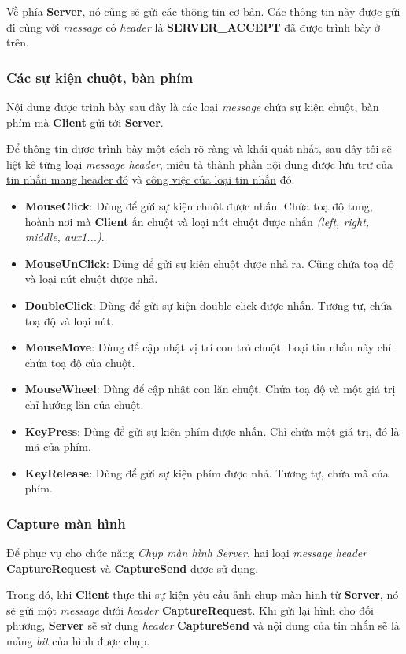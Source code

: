 Về phía \textbf{Server}, nó cũng sẽ gửi các thông tin cơ bản. Các thông tin này được gửi đi cùng với \textit{message} có  \textit{header} là \textbf{SERVER\_ACCEPT} đã được trình bày ở trên.

\subsubsection {Các sự kiện chuột, bàn phím}

Nội dung được trình bày sau đây là các loại \textit{message} chứa sự kiện chuột, bàn phím mà \textbf{Client} gửi tới \textbf{Server}.

Để thông tin được trình bày một cách rõ ràng và khái quát nhất, sau đây tôi sẽ liệt kê từng loại \textit{message header}, miêu tả thành phần nội dung được lưu trữ của \underline{tin nhắn mang header đó} và \underline{công việc của loại tin nhắn} đó.

\begin{itemize}
	\item \textbf{MouseClick}:  Dùng để gửi sự kiện chuột được nhấn. Chứa toạ độ tung, hoành nơi mà \textbf{Client} ấn chuột và loại nút chuột được nhấn \textit{(left, right, middle, aux1...)}.
	\item \textbf{MouseUnClick}: Dùng để gửi sự kiện chuột được nhả ra. Cũng chứa toạ độ và loại nút chuột được nhả.
	\item \textbf{DoubleClick}: Dùng để gửi sự kiện double-click được nhấn. Tương tự, chứa toạ độ và loại nút.
	\item \textbf{MouseMove}: Dùng để cập nhật vị trí con trỏ chuột. Loại tin nhắn này chỉ chứa toạ độ của chuột.
	\item \textbf{MouseWheel}: Dùng để cập nhật con lăn chuột. Chứa toạ độ và một giá trị chỉ hướng lăn của chuột.
	\item \textbf{KeyPress}: Dùng để gửi sự kiện phím được nhấn. Chỉ chứa một giá trị, đó là mã của phím.
	\item \textbf{KeyRelease}: Dùng để gửi sự kiện phím được nhả. Tương tự, chứa mã của phím.
\end{itemize}

\subsubsection{Capture màn hình}

Để phục vụ cho chức năng \textit{Chụp màn hình Server}, hai loại \textit{message header} \textbf{CaptureRequest} và \textbf{CaptureSend} được sử dụng.

Trong đó, khi \textbf{Client} thực thi sự kiện yêu cầu ảnh chụp màn hình từ \textbf{Server}, nó sẽ gửi một \textit{message} dưới \textit{header} \textbf{CaptureRequest}. Khi gửi lại hình cho đối phương, \textbf{Server} sẽ sử dụng \textit{header} \textbf{CaptureSend}  và nội dung của tin nhắn sẽ là mảng \textit{bit} của hình được chụp.


